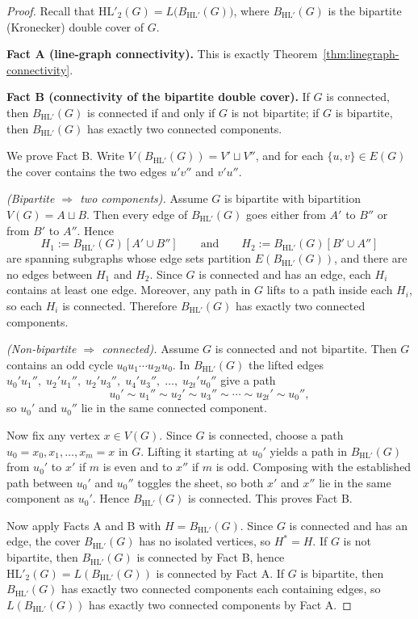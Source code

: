 \documentclass[10pt,a4paper]{amsart}
\newcommand{\HL}{\mathrm{HL}}
\begin{document}
\begin{proof}
Recall that \(\HL'_2(G)=L\!\big(B_{\HL'}(G)\big)\), where \(B_{\HL'}(G)\) is the
bipartite (Kronecker) double cover of \(G\).


\noindent\textbf{Fact A (line-graph connectivity).}
This is exactly Theorem~\ref{thm:linegraph-connectivity}.


\medskip
\noindent\textbf{Fact B (connectivity of the bipartite double cover).}
If \(G\) is connected, then \(B_{\HL'}(G)\) is connected if and only if \(G\) is
not bipartite; if \(G\) is bipartite, then \(B_{\HL'}(G)\) has exactly two
connected components.

\smallskip
We prove Fact B. Write \(V(B_{\HL'}(G))=V'\sqcup V''\), and for each
\(\{u,v\}\in E(G)\) the cover contains the two edges \(u'v''\) and \(v'u''\).

\smallskip
\emph{(Bipartite \(\Rightarrow\) two components).}
Assume \(G\) is bipartite with bipartition \(V(G)=A\sqcup B\).
Then every edge of \(B_{\HL'}(G)\) goes either from \(A'\) to \(B''\) or from
\(B'\) to \(A''\). Hence
\[
H_1 := B_{\HL'}(G)[A'\cup B'']\qquad\text{and}\qquad
H_2 := B_{\HL'}(G)[B'\cup A'']
\]
are spanning subgraphs whose edge sets partition \(E(B_{\HL'}(G))\), and there
are no edges between \(H_1\) and \(H_2\). Since \(G\) is connected and has an
edge, each \(H_i\) contains at least one edge. Moreover, any path in \(G\)
lifts to a path inside each \(H_i\), so each \(H_i\) is connected. Therefore
\(B_{\HL'}(G)\) has exactly two connected components.

\smallskip
\emph{(Non-bipartite \(\Rightarrow\) connected).}
Assume \(G\) is connected and not bipartite. Then \(G\) contains an odd cycle
\(u_0u_1\cdots u_{2t}u_0\). In \(B_{\HL'}(G)\) the lifted edges
\(
u_0'u_1'',\;
u_2'u_1'',\;
u_2'u_3'',\;
u_4'u_3'',\;
\dots,\;
u_{2t}'u_0''
\)
give a path
\[
u_0' \sim u_1'' \sim u_2' \sim u_3'' \sim \cdots \sim u_{2t}' \sim u_0'',
\]
so \(u_0'\) and \(u_0''\) lie in the same connected component.

Now fix any vertex \(x\in V(G)\). Since \(G\) is connected, choose a path
\(u_0=x_0,x_1,\dots,x_m=x\) in \(G\). Lifting it starting at \(u_0'\) yields a
path in \(B_{\HL'}(G)\) from \(u_0'\) to \(x'\) if \(m\) is even and to \(x''\)
if \(m\) is odd. Composing with the established path between \(u_0'\) and
\(u_0''\) toggles the sheet, so both \(x'\) and \(x''\) lie in the same
component as \(u_0'\). Hence \(B_{\HL'}(G)\) is connected. This proves Fact B.

\medskip
Now apply Facts A and B with \(H=B_{\HL'}(G)\). Since \(G\) is connected and has
an edge, the cover \(B_{\HL'}(G)\) has no isolated vertices, so \(H^\ast=H\).
If \(G\) is not bipartite, then \(B_{\HL'}(G)\) is connected by Fact B, hence
\(\HL'_2(G)=L(B_{\HL'}(G))\) is connected by Fact A. If \(G\) is bipartite, then
\(B_{\HL'}(G)\) has exactly two connected components each containing edges, so
\(L(B_{\HL'}(G))\) has exactly two connected components by Fact A.
\end{proof}
\end{document}
